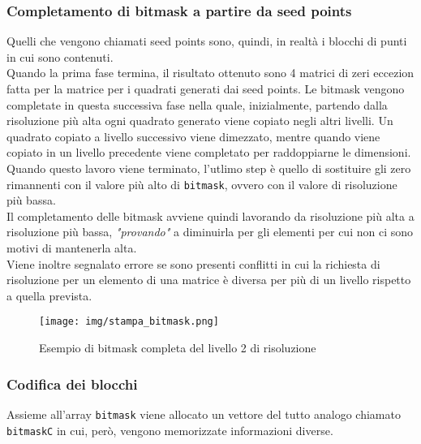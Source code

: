 			\subsubsection{Completamento di bitmask a partire da seed points}
				Quelli che vengono chiamati seed points sono, quindi, in realt\`{a} i blocchi di punti in cui sono contenuti. \\
				Quando la prima fase termina, il risultato ottenuto sono 4 matrici di zeri eccezion fatta per la matrice per i quadrati generati dai seed points. Le bitmask vengono completate in questa successiva fase nella quale, inizialmente, partendo dalla risoluzione pi\`{u} alta ogni quadrato generato viene copiato negli altri livelli. Un quadrato copiato a livello successivo viene dimezzato, mentre quando viene copiato in un livello precedente viene completato per raddoppiarne le dimensioni.\\
				Quando questo lavoro viene terminato, l'utlimo step \`{e} quello di sostituire gli zero rimannenti con il valore pi\`{u} alto di \texttt{bitmask}, ovvero con il valore di risoluzione pi\`{u} bassa. \\
				Il completamento delle bitmask avviene quindi lavorando da risoluzione pi\`{u} alta a risoluzione pi\`{u} bassa, \textit{"provando"} a diminuirla per gli elementi per cui non ci sono motivi di mantenerla alta. \\
				Viene inoltre segnalato errore se sono presenti conflitti in cui la richiesta di risoluzione per un elemento di una matrice \`{e} diversa per pi\`{u} di un livello rispetto a quella prevista. 
				\begin{figure}[htbp]
					\centering
					\texttt{[image: img/stampa\_bitmask.png]}
					\caption{Esempio di bitmask completa del livello 2 di risoluzione}
				\end{figure} 

			\subsubsection{Codifica dei blocchi} 
				Assieme all'array \texttt{bitmask} viene allocato un vettore del tutto analogo chiamato \texttt{bitmaskC} in cui, per\`{o}, vengono memorizzate informazioni diverse.

